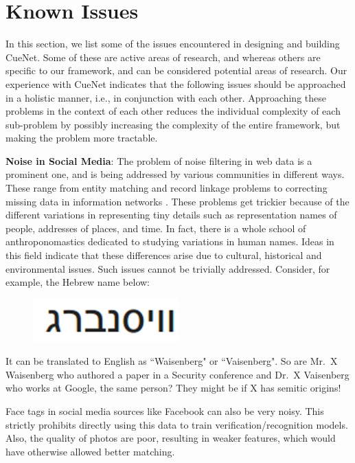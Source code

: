 \section{Known Issues}
In this section, we list some of the issues encountered in designing and building CueNet. Some of these are active areas of research, and whereas others are specific to our framework, and can be considered potential areas of research. Our experience with CueNet indicates that the following issues should be approached in a holistic manner, i.e., in conjunction with each other. Approaching these problems in the context of each other reduces the individual complexity of each sub-problem by possibly increasing the complexity of the entire framework, but making the problem more tractable.

\textbf{\textbf{Noise in Social Media}}: The problem of noise filtering in web data is a prominent one, and is being addressed by various communities in different ways. These range from entity matching and record linkage problems \cite{elmagarmid2007duplicate} to correcting missing data in information networks \cite{sadikov2011correcting}. These problems get trickier because of the different variations in representing tiny details such as representation names of people, addresses of places, and time. In fact, there is a whole school of anthroponomastics \cite{schneider2009s} dedicated to studying variations in human names. Ideas in this field indicate that these differences arise due to cultural, historical and environmental issues\cite{al2009socio}. Such issues cannot be trivially addressed. Consider, for example, the Hebrew name below:

\begin{figure}[h]
\centering
\includegraphics[width=0.5\textwidth]{media/ronen.png}
\label{fig:exp-general-loc-cx}
\end{figure}

It can be translated to English as ``Waisenberg" or ``Vaisenberg". So are Mr.\ X Waisenberg who authored a paper in a Security conference and Dr.\ X Vaisenberg who works at Google, the same person? They might be if X has semitic origins!

Face tags in social media sources like Facebook can also be very noisy. This strictly prohibits directly using this data to train verification/recognition models. Also, the quality of photos are poor, resulting in weaker features, which would have otherwise allowed better matching. 

